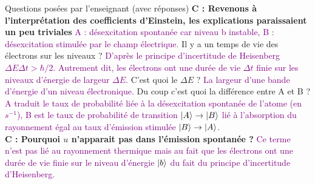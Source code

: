 \begin{reportBlock}{Questions posées par l’enseignant (avec réponses)}
   \textbf{C : Revenons à l'interprétation des coefficients d'Einstein, les explications paraissaient un peu triviales} \textcolor{purple}{A : désexcitation spontanée car niveau b instable, B : désexcitation stimulée par le champ électrique. } Il y a un temps de vie des électrons sur les niveaux ? \textcolor{purple}{D'après le principe d'incertitude de Heisenberg $\Delta E\Delta t>\hbar/2$. Autrement dit, les électrons ont une durée de vie $\Delta t$ finie sur les niveaux d'énergie de largeur $\Delta E$.} C'est quoi le $\Delta E$ ? \textcolor{purple}{La largeur d'une bande d'énergie d'un niveau électronique.} Du coup c'est quoi la différence entre A et B ? \textcolor{purple}{A traduit le taux de probabilité liée à la désexcitation spontanée de l'atome (en $s^{-1}$), B est le taux de probabilité de transition $\ket{A}\rightarrow \ket{B}$ lié à l'absorption du rayonnement égal au taux d'émission stimulée $\ket{B}\rightarrow \ket{A}$.}\\
   \textbf{C : Pourquoi $u$ n'apparait pas dans l'émission spontanée ?} \textcolor{purple}{Ce terme n'est pas lié au rayonnement thermique mais au fait que les électrons ont une durée de vie finie sur le niveau d'énergie $\ket{b}$ du fait du principe d'incertitude d'Heisenberg.}
  
\end{reportBlock}


